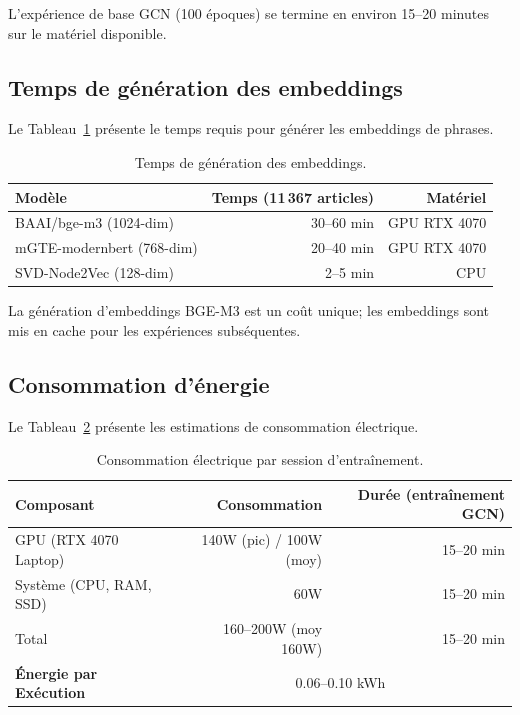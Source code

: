 L'expérience de base GCN (100 époques) se termine en environ 15--20 minutes sur le matériel disponible.

\subsection{Temps de génération des embeddings}

Le Tableau~\ref{tab:embedding-time} présente le temps requis pour générer les embeddings de phrases.

\begin{table}[htbp]
\centering
\caption{Temps de génération des embeddings.}
\label{tab:embedding-time}
\begin{tabular}{lrr}
\toprule
\textbf{Modèle} & \textbf{Temps (11\,367 articles)} & \textbf{Matériel} \\
\midrule
BAAI/bge-m3 (1024-dim) & 30--60 min & GPU RTX 4070 \\
mGTE-modernbert (768-dim) & 20--40 min & GPU RTX 4070 \\
SVD-Node2Vec (128-dim) & 2--5 min & CPU \\
\bottomrule
\end{tabular}
\end{table}

La génération d'embeddings BGE-M3 est un coût unique; les embeddings sont mis en cache pour les expériences subséquentes.

\subsection{Consommation d'énergie}

Le Tableau~\ref{tab:power-consumption} présente les estimations de consommation électrique.

\begin{table}[htbp]
\centering
\caption{Consommation électrique par session d'entraînement.}
\label{tab:power-consumption}
\begin{tabular}{lrr}
\toprule
\textbf{Composant} & \textbf{Consommation} & \textbf{Durée (entraînement GCN)} \\
\midrule
GPU (RTX 4070 Laptop) & 140W (pic) / 100W (moy) & 15--20 min \\
Système (CPU, RAM, SSD) & 60W & 15--20 min \\
Total & 160--200W (moy ~160W) & 15--20 min \\
\midrule
\textbf{Énergie par Exécution} & \multicolumn{2}{c}{0.06--0.10 kWh} \\
\bottomrule
\end{tabular}
\end{table}

